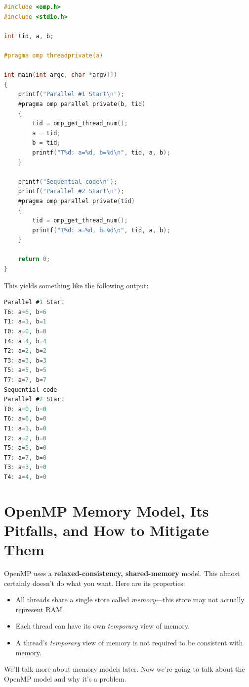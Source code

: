 \documentclass[a4paper]{report}
\begin{document}
\begin{lstlisting}[language=C,morekeywords={foreach,pragma,omp,parallel,single,nowait,task,untied,barrier,taskyield}]
#include <omp.h>
#include <stdio.h>

int tid, a, b;

#pragma omp threadprivate(a)

int main(int argc, char *argv[])
{
    printf("Parallel #1 Start\n");
    #pragma omp parallel private(b, tid)
    {
        tid = omp_get_thread_num();
        a = tid;
        b = tid;
        printf("T%d: a=%d, b=%d\n", tid, a, b);
    }

    printf("Sequential code\n");
    printf("Parallel #2 Start\n");
    #pragma omp parallel private(tid)
    {
        tid = omp_get_thread_num();
        printf("T%d: a=%d, b=%d\n", tid, a, b);
    }

    return 0;
}    
  \end{lstlisting}
This yields something like the following output:
\begin{lstlisting}[language=C,morekeywords={foreach,pragma,omp,parallel,single,nowait,task,untied,barrier,taskyield}]
% ./a.out
Parallel #1 Start
T6: a=6, b=6
T1: a=1, b=1
T0: a=0, b=0
T4: a=4, b=4
T2: a=2, b=2
T3: a=3, b=3
T5: a=5, b=5
T7: a=7, b=7
Sequential code
Parallel #2 Start
T0: a=0, b=0
T6: a=6, b=0
T1: a=1, b=0
T2: a=2, b=0
T5: a=5, b=0
T7: a=7, b=0
T3: a=3, b=0
T4: a=4, b=0
\end{lstlisting}

\section*{OpenMP Memory Model, Its Pitfalls, and How to Mitigate Them}
OpenMP uses a {\bf relaxed-consistency, shared-memory} model. This almost certainly doesn't 
do what you want. Here are its properties:

\begin{itemize}
    \item All threads share a single store called
      \emph{memory}---this store may not actually represent RAM.
    \item Each thread can have its own {\it temporary} view of memory.
    \item A thread's {\it temporary} view of memory is not required to be
      consistent with memory.
\end{itemize}

We'll talk more about memory models later. Now we're going to talk about 
the OpenMP model and why it's a problem.
\end{document}
